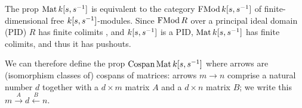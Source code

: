 
The prop $\operatorname{\mathrm{Mat}} {k[s,s^{-1}]}$ is equivalent to the category $\operatorname{\mathrm{FMod}}{k[s,s^{-1}]}$ of
finite-dimensional free ${k[s,s^{-1}]}$-modules. Since $\operatorname{\mathrm{FMod}} R$ over a principal ideal
domain (PID) $R$ has finite colimits \cite{BSZ2}, and ${k[s,s^{-1}]}$ is a PID, $\operatorname{\mathrm{Mat}} {k[s,s^{-1}]}$
has finite colimits, and thus it has pushouts.

We can therefore define the prop $\operatorname{{Cospan}}\operatorname{\mathrm{Mat}}{k[s,s^{-1}]}$ where arrows are (isomorphism
classes of) cospans of matrices: arrows $m \to n$ comprise a natural number
$d$ together with a $d\times m$ matrix $A$ and a $d\times n$ matrix $B$; we
write this $m\xrightarrow{A} d \xleftarrow{B}n$. 

